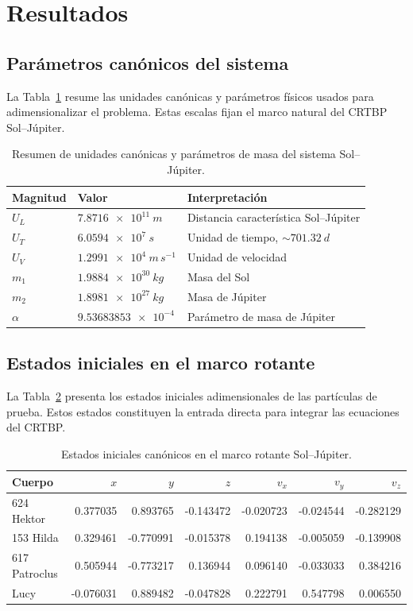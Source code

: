 \documentclass[12pt,a4paper]{article}
\begin{document}
\section{Resultados}
\subsection{Parámetros canónicos del sistema}
La Tabla~\ref{tab:unidades} resume las unidades canónicas y parámetros físicos usados para adimensionalizar el problema. Estas escalas fijan el marco natural del CRTBP Sol--Júpiter.

\begin{table}[H]
\centering
\caption{Resumen de unidades canónicas y parámetros de masa del sistema Sol--Júpiter.}
\label{tab:unidades}
\begin{tabular}{lll}
\toprule
\textbf{Magnitud} & \textbf{Valor} & \textbf{Interpretación} \\
\midrule
\(U_L\) & \(\SI{7.8716e11}{m}\) & Distancia característica Sol--Júpiter \\
\(U_T\) & \(\SI{6.0594e7}{s}\) & Unidad de tiempo, \(\sim\SI{701.32}{d}\) \\
\(U_V\) & \(\SI{1.2991e4}{m\,s^{-1}}\) & Unidad de velocidad \\
\(m_1\) & \(\SI{1.9884e30}{kg}\) & Masa del Sol \\
\(m_2\) & \(\SI{1.8981e27}{kg}\) & Masa de Júpiter \\
\(\alpha\) & \(\num{9.53683853e-4}\) & Parámetro de masa de Júpiter \\
\bottomrule
\end{tabular}
\end{table}

\subsection{Estados iniciales en el marco rotante}
La Tabla~\ref{tab:estados} presenta los estados iniciales adimensionales de las partículas de prueba. Estos estados constituyen la entrada directa para integrar las ecuaciones del CRTBP.

\begin{table}[H]
\centering
\caption{Estados iniciales canónicos en el marco rotante Sol--Júpiter.}
\label{tab:estados}
\begin{tabular}{lrrrrrr}
\toprule
\textbf{Cuerpo} & \(x\) & \(y\) & \(z\) & \(v_x\) & \(v_y\) & \(v_z\) \\
\midrule
624 Hektor & 0.377035 & 0.893765 & -0.143472 & -0.020723 & -0.024544 & -0.282129 \\
153 Hilda & 0.329461 & -0.770991 & -0.015378 & 0.194138 & -0.005059 & -0.139908 \\
617 Patroclus & 0.505944 & -0.773217 & 0.136944 & 0.096140 & -0.033033 & 0.384216 \\
Lucy & -0.076031 & 0.889482 & -0.047828 & 0.222791 & 0.547798 & 0.006550 \\
\bottomrule
\end{tabular}
\end{table}
\end{document}
